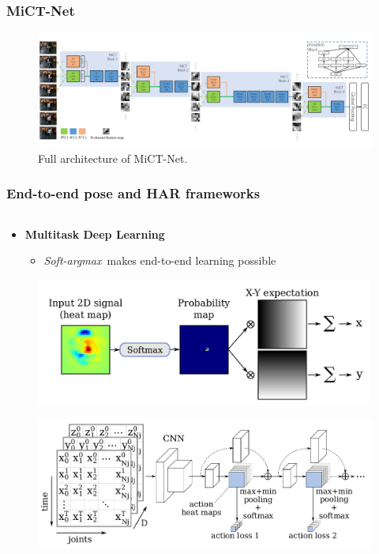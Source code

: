 \documentclass[9pt]{beamer}
\newenvironment{myframe}[1][]{%
\begin{frame}%
\frametitle{#1}
\setcounter{footnote}{0}


}{%
\end{frame}%
}
\begin{document}
\begin{myframe}[MiCT-Net]
	\begin{figure}
		\includegraphics[width=.99\textwidth]{mict-full.png}
		\caption{Full architecture of MiCT-Net.}
	\end{figure}
\end{myframe}

\begin{myframe}[End-to-end pose and HAR frameworks]
	\begin{columns}[T]
	\begin{column}{.45\textwidth}
		\begin{itemize}
			\item \textbf{Multitask Deep Learning}\footnotemark
			\begin{itemize}
				\item \textit{Soft-argmax}\footnotemark~makes end-to-end learning possible
			\end{itemize}
		\end{itemize}
        \begin{figure}
            \includegraphics[width=0.99\textwidth]{softargmax.png}
        \end{figure}
		\begin{figure}
            \includegraphics[width=.99\textwidth]{jointsovertime.png}

\end{figure}
\end{column}
\end{columns}
\end{myframe}
\end{document}
